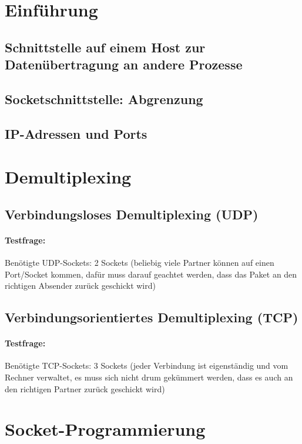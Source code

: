 \section{Einführung}
\subsection{Schnittstelle auf einem Host zur Datenübertragung an andere Prozesse}
\subsection{Socketschnittstelle: Abgrenzung}
\subsection{IP-Adressen und Ports}
\section{Demultiplexing}
\subsection{Verbindungsloses Demultiplexing (UDP)}
\paragraph{Testfrage:} Benötigte UDP-Sockets: 2 Sockets (beliebig viele Partner können auf einen Port/Socket kommen, dafür muss darauf geachtet werden, dass das Paket an den richtigen Absender zurück geschickt wird)
\subsection{Verbindungsorientiertes Demultiplexing (TCP)}
\paragraph{Testfrage:} Benötigte TCP-Sockets: 3 Sockets (jeder Verbindung ist eigenständig und vom Rechner verwaltet, es muss sich nicht drum gekümmert werden, dass es auch an den richtigen Partner zurück geschickt wird)
\section{Socket-Programmierung}

